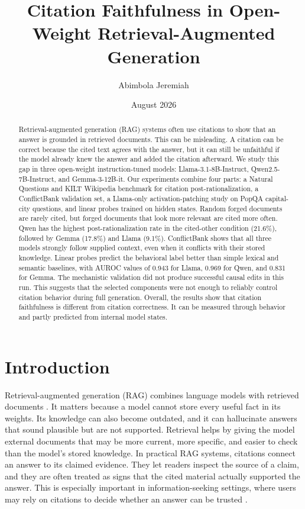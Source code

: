 \documentclass[11pt]{article}
\title{Citation Faithfulness in Open-Weight Retrieval-Augmented Generation}
\author{Abimbola Jeremiah}
\date{August 2026}
\begin{document}
\sloppy
\maketitle

\begin{abstract}
Retrieval-augmented generation (RAG) systems often use citations to show that an answer is grounded in retrieved documents. This can be misleading. A citation can be correct because the cited text agrees with the answer, but it can still be unfaithful if the model already knew the answer and added the citation afterward. We study this gap in three open-weight instruction-tuned models: Llama-3.1-8B-Instruct, Qwen2.5-7B-Instruct, and Gemma-3-12B-it. Our experiments combine four parts: a Natural Questions and KILT Wikipedia benchmark for citation post-rationalization, a ConflictBank validation set, a Llama-only activation-patching study on PopQA capital-city questions, and linear probes trained on hidden states. Random forged documents are rarely cited, but forged documents that look more relevant are cited more often. Qwen has the highest post-rationalization rate in the cited-other condition (21.6\%), followed by Gemma (17.8\%) and Llama (9.1\%). ConflictBank shows that all three models strongly follow supplied context, even when it conflicts with their stored knowledge. Linear probes predict the behavioral label better than simple lexical and semantic baselines, with AUROC values of 0.943 for Llama, 0.969 for Qwen, and 0.831 for Gemma. The mechanistic validation did not produce successful causal edits in this run. This suggests that the selected components were not enough to reliably control citation behavior during full generation. Overall, the results show that citation faithfulness is different from citation correctness. It can be measured through behavior and partly predicted from internal model states.
\end{abstract}

\section{Introduction}
\label{sec:introduction}

Retrieval-augmented generation (RAG) combines language models with retrieved documents \cite{lewis2020rag,guu2020realm,izacard2021fid}. It matters because a model cannot store every useful fact in its weights. Its knowledge can also become outdated, and it can hallucinate answers that sound plausible but are not supported. Retrieval helps by giving the model external documents that may be more current, more specific, and easier to check than the model's stored knowledge. In practical RAG systems, citations connect an answer to its claimed evidence. They let readers inspect the source of a claim, and they are often treated as signs that the cited material actually supported the answer. This is especially important in information-seeking settings, where users may rely on citations to decide whether an answer can be trusted \cite{liu2023verifiability}.
\end{document}
